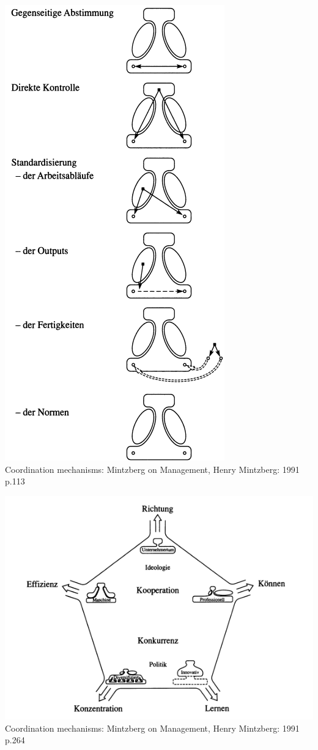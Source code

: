 \documentclass[a4paper,12pt]{article}
\begin{document}
\begin{center}
\includegraphics[scale=0.7]{koordinationsmechanismen.png}\\
{Coordination mechanisms: Mintzberg on Management, Henry Mintzberg:
  1991 p.113}
\label{fig:coordination}

\includegraphics[scale=0.7]{forces.png}\\
{Coordination mechanisms: Mintzberg on Management, Henry Mintzberg:
  1991 p.264}
\label{fig:forces}


\end{center}
\end{document}
